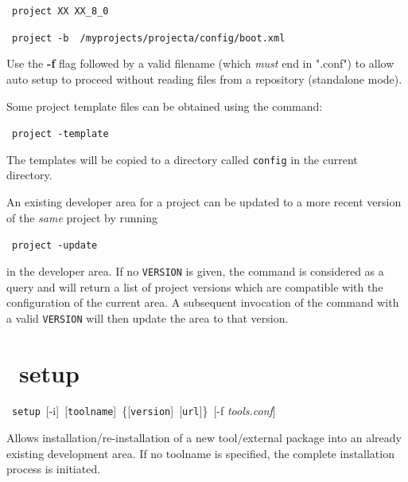 \mbox{}

\hspace{5mm}\scram~\texttt{project}~\texttt{XX}~\texttt{XX\_8\_0}

\hspace{5mm}\scram~\texttt{project}~\texttt{-b}~\texttt{~/myprojects/projecta/config/boot.xml}

\ni Use the \textbf{-f} flag followed by a valid filename (which \textit{must} end in ".conf") to
allow auto setup to proceed without reading files from a repository (standalone mode).

\ni Some project template files can be obtained using the command:

\hspace{5mm}\scram~\texttt{project}~\texttt{-template}

\ni The templates will be copied to a directory called \texttt{config} in the current directory.

\ni An existing developer area for a project can be updated to a more recent version of
the \textit{same} project by running 

\hspace{5mm}\scram~\texttt{project}~\texttt{-update}~ 

\ni in the developer area. If no \texttt{VERSION} is given, the command is
considered as a query and will return a list of project versions which
are compatible with the configuration of the current area.
A subsequent invocation of the command with a valid \texttt{VERSION} will then update the area
to that version.

\section{\scram\ setup}

\hspace{5mm}\scram~\texttt{setup}~[-i]~[\texttt{toolname}]~\{[\texttt{version}]~[\texttt{url}]\}~[-f \textit{tools.conf}]

\ni Allows installation/re-installation of a new tool/external package into an
already existing development area. If no toolname is specified,
the complete installation process is initiated.

